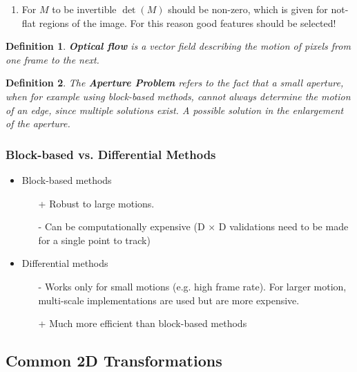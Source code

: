 \documentclass[10pt,a4paper]{scrartcl}
\newtheorem{define}{Definition}
\begin{document}
\begin{multicols*}{2}
\begin{itemize}
\begin{enumerate}
\item For $M$ to be invertible $\det(M)$ should be non-zero, which is given for not-flat regions of the image. For this reason good features should be selected!
\end{enumerate}
\end{itemize}

\begin{define}
\textbf{Optical flow} is a vector field describing the motion of pixels from one frame to the next.
\end{define}

\begin{define}
The \textbf{Aperture Problem} refers to the fact that a small aperture, when for example using block-based methods, cannot always determine the motion of an edge, since multiple solutions exist. A possible solution in the enlargement of the aperture.
\end{define}

\subsubsection{Block-based vs. Differential Methods}

\begin{itemize}
\item Block-based methods
\begin{itemize}
\item[+] Robust to large motions.
\item[-] Can be computationally expensive (D $\times$ D validations need to be made for a single point to track)
\end{itemize}
\item Differential methods
\begin{itemize}
\item[-] Works only for small motions (e.g. high frame rate). For larger motion, multi-scale implementations are used but are more expensive.
\item[+] Much more efficient than block-based methods
\end{itemize}
\end{itemize}

\subsection{Common 2D Transformations}


\end{multicols*}
\end{document}
